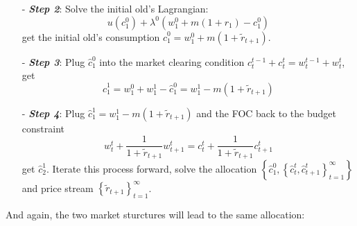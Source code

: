 \documentclass[10pt,landscape,a4paper]{article}
\begin{document}
\begin{multicols*}{3}
\begin{itemize}
    \item[-] \textit{\textbf{Step 2}}: Solve the initial old's Lagrangian:
    $$u(c^0_1)+\lambda^0\left(w_1^0+m(1+r_1)-c_1^0\right)$$ get the initial old's consumption $\hat{c}^0_1=w_1^0+m(1+\tilde{r}_{t+1})$.
    
    \item[-] \textbf{\textit{Step 3}}: Plug $\hat{c}_1^0$ into the market clearing condition $c_t^{t-1} +c_t^t=w_t^{t-1}+w_t^t$, get
    $$\hat{c}_1^1=w_1^0+w_1^1-\hat{c}_1^0=w_1^1-m(1+\tilde{r}_{t+1})$$
    
    \item[-] \textit{\textbf{Step 4}}: Plug $\hat{c}_1^1=w_1^1-m(1+\tilde{r}_{t+1})$ and the FOC back to the budget constraint
    $$w_t^t+\frac{1}{1+\tilde{r}_{t+1}}w_{t+1}^t= c_t^t+\frac{1}{1+\tilde{r}_{t+1}}c^t_{t+1}$$
    get $\hat{c}^1_2$. Iterate this process forward, solve the allocation $\left\{\hat{c}^0_1,\left\{\hat{c}^t_t,\hat{c}^t_{t+1}\right\}^{\infty}_{t=1}\right\}$ and price stream $\left\{\tilde{r}_{t+1}\right\}^{\infty}_{t=1}$.
\end{itemize}

\vspace{2pt}
And again, the two market sturctures will lead to the same allocation:

\vspace{2pt}
\end{multicols*}
\end{document}
